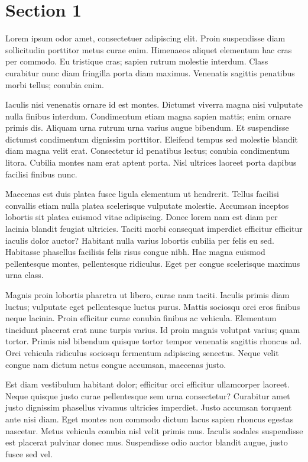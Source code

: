 \section{Section 1}
Lorem ipsum odor amet, consectetuer adipiscing elit. Proin suspendisse diam
sollicitudin porttitor metus curae enim. Himenaeos aliquet elementum hac cras
per commodo. Eu tristique cras; sapien rutrum molestie interdum. Class
curabitur nunc diam fringilla porta diam maximus. Venenatis sagittis penatibus
morbi tellus; conubia enim.

Iaculis nisi venenatis ornare id est montes. Dictumst viverra magna nisi
vulputate nulla finibus interdum. Condimentum etiam magna sapien mattis; enim
ornare primis dis. Aliquam urna rutrum urna varius augue bibendum. Et
suspendisse dictumst condimentum dignissim porttitor. Eleifend tempus sed
molestie blandit diam magna velit erat. Consectetur id penatibus lectus;
conubia condimentum litora. Cubilia montes nam erat aptent porta. Nisl ultrices
laoreet porta dapibus facilisi finibus nunc.

Maecenas est duis platea fusce ligula elementum ut hendrerit. Tellus facilisi
convallis etiam nulla platea scelerisque vulputate molestie. Accumsan inceptos
lobortis sit platea euismod vitae adipiscing. Donec lorem nam est diam per
lacinia blandit feugiat ultricies. Taciti morbi consequat imperdiet efficitur
efficitur iaculis dolor auctor? Habitant nulla varius lobortis cubilia per
felis eu sed. Habitasse phasellus facilisis felis risus congue nibh. Hac magna
euismod pellentesque montes, pellentesque ridiculus. Eget per congue
scelerisque maximus urna class.

Magnis proin lobortis pharetra ut libero, curae nam taciti. Iaculis primis diam
luctus; vulputate eget pellentesque luctus purus. Mattis sociosqu orci eros
finibus neque lacinia. Proin efficitur curae conubia finibus ac vehicula.
Elementum tincidunt placerat erat nunc turpis varius. Id proin magnis volutpat
varius; quam tortor. Primis nisl bibendum quisque tortor tempor venenatis
sagittis rhoncus ad. Orci vehicula ridiculus sociosqu fermentum adipiscing
senectus. Neque velit congue nam dictum netus congue accumsan, maecenas justo.

Est diam vestibulum habitant dolor; efficitur orci efficitur ullamcorper
laoreet. Neque quisque justo curae pellentesque sem urna consectetur? Curabitur
amet justo dignissim phasellus vivamus ultricies imperdiet. Justo accumsan
torquent ante nisi diam. Eget montes non commodo dictum lacus sapien rhoncus
egestas nascetur. Metus vehicula conubia nisl velit primis mus. Iaculis sodales
suspendisse est placerat pulvinar donec mus. Suspendisse odio auctor blandit
augue, justo fusce sed vel.

